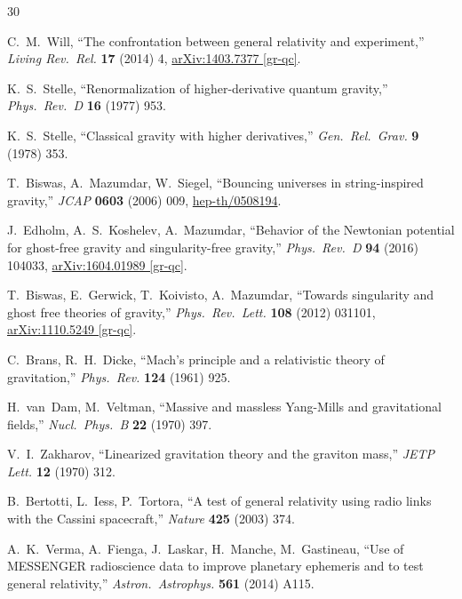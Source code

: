 \documentclass[11pt,a4paper]{article}
\theoremstyle{plain}
\theoremstyle{definition}
\theoremstyle{remark}
\begin{document}
\begin{thebibliography}{30}

C.~M.~Will,
``The confrontation between general relativity and experiment,''
\textit{Living Rev.\ Rel.} \textbf{17} (2014) 4,
\href{https://arxiv.org/abs/1403.7377}{arXiv:1403.7377 [gr-qc]}.

K.~S.~Stelle,
``Renormalization of higher-derivative quantum gravity,''
\textit{Phys.\ Rev.\ D} \textbf{16} (1977) 953.

K.~S.~Stelle,
``Classical gravity with higher derivatives,''
\textit{Gen.\ Rel.\ Grav.} \textbf{9} (1978) 353.

T.~Biswas, A.~Mazumdar, W.~Siegel,
``Bouncing universes in string-inspired gravity,''
\textit{JCAP} \textbf{0603} (2006) 009,
\href{https://arxiv.org/abs/hep-th/0508194}{hep-th/0508194}.

J.~Edholm, A.~S.~Koshelev, A.~Mazumdar,
``Behavior of the Newtonian potential for ghost-free gravity
and singularity-free gravity,''
\textit{Phys.\ Rev.\ D} \textbf{94} (2016) 104033,
\href{https://arxiv.org/abs/1604.01989}{arXiv:1604.01989 [gr-qc]}.

T.~Biswas, E.~Gerwick, T.~Koivisto, A.~Mazumdar,
``Towards singularity and ghost free theories of gravity,''
\textit{Phys.\ Rev.\ Lett.} \textbf{108} (2012) 031101,
\href{https://arxiv.org/abs/1110.5249}{arXiv:1110.5249 [gr-qc]}.

C.~Brans, R.~H.~Dicke,
``Mach's principle and a relativistic theory of gravitation,''
\textit{Phys.\ Rev.} \textbf{124} (1961) 925.

H.~van~Dam, M.~Veltman,
``Massive and massless Yang-Mills and gravitational fields,''
\textit{Nucl.\ Phys.\ B} \textbf{22} (1970) 397.

V.~I.~Zakharov,
``Linearized gravitation theory and the graviton mass,''
\textit{JETP Lett.} \textbf{12} (1970) 312.

B.~Bertotti, L.~Iess, P.~Tortora,
``A test of general relativity using radio links with the Cassini
spacecraft,''
\textit{Nature} \textbf{425} (2003) 374.

A.~K.~Verma, A.~Fienga, J.~Laskar, H.~Manche, M.~Gastineau,
``Use of MESSENGER radioscience data to improve planetary
ephemeris and to test general relativity,''
\textit{Astron.\ Astrophys.} \textbf{561} (2014) A115.


\end{thebibliography}
\end{document}
